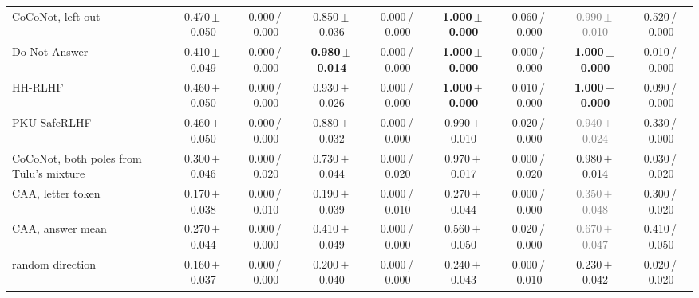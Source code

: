 \begin{tabular}{@{}lcccccccc@{}}
CoCoNot, left out & 0.470\,{\scriptsize$\pm$\,0.050} & {\scriptsize 0.000\,/\,0.000} & 0.850\,{\scriptsize$\pm$\,0.036} & {\scriptsize 0.000\,/\,0.000} & \textbf{1.000\,{\scriptsize$\pm$\,0.000}} & {\scriptsize 0.060\,/\,0.000} & \textcolor{gray}{0.990\,{\scriptsize$\pm$\,0.010}} & {\scriptsize 0.520\,/\,0.000} \\
Do-Not-Answer & 0.410\,{\scriptsize$\pm$\,0.049} & {\scriptsize 0.000\,/\,0.000} & \textbf{0.980\,{\scriptsize$\pm$\,0.014}} & {\scriptsize 0.000\,/\,0.000} & \textbf{1.000\,{\scriptsize$\pm$\,0.000}} & {\scriptsize 0.000\,/\,0.000} & \textbf{1.000\,{\scriptsize$\pm$\,0.000}} & {\scriptsize 0.010\,/\,0.000} \\
HH-RLHF & 0.460\,{\scriptsize$\pm$\,0.050} & {\scriptsize 0.000\,/\,0.000} & 0.930\,{\scriptsize$\pm$\,0.026} & {\scriptsize 0.000\,/\,0.000} & \textbf{1.000\,{\scriptsize$\pm$\,0.000}} & {\scriptsize 0.010\,/\,0.000} & \textbf{1.000\,{\scriptsize$\pm$\,0.000}} & {\scriptsize 0.090\,/\,0.000} \\
PKU-SafeRLHF & 0.460\,{\scriptsize$\pm$\,0.050} & {\scriptsize 0.000\,/\,0.000} & 0.880\,{\scriptsize$\pm$\,0.032} & {\scriptsize 0.000\,/\,0.000} & 0.990\,{\scriptsize$\pm$\,0.010} & {\scriptsize 0.020\,/\,0.000} & \textcolor{gray}{0.940\,{\scriptsize$\pm$\,0.024}} & {\scriptsize 0.330\,/\,0.000} \\
CoCoNot, both poles from T\"ulu's mixture & 0.300\,{\scriptsize$\pm$\,0.046} & {\scriptsize 0.000\,/\,0.020} & 0.730\,{\scriptsize$\pm$\,0.044} & {\scriptsize 0.000\,/\,0.020} & 0.970\,{\scriptsize$\pm$\,0.017} & {\scriptsize 0.000\,/\,0.020} & 0.980\,{\scriptsize$\pm$\,0.014} & {\scriptsize 0.030\,/\,0.020} \\
CAA, letter token & 0.170\,{\scriptsize$\pm$\,0.038} & {\scriptsize 0.000\,/\,0.010} & 0.190\,{\scriptsize$\pm$\,0.039} & {\scriptsize 0.000\,/\,0.010} & 0.270\,{\scriptsize$\pm$\,0.044} & {\scriptsize 0.000\,/\,0.000} & \textcolor{gray}{0.350\,{\scriptsize$\pm$\,0.048}} & {\scriptsize 0.300\,/\,0.020} \\
CAA, answer mean & 0.270\,{\scriptsize$\pm$\,0.044} & {\scriptsize 0.000\,/\,0.000} & 0.410\,{\scriptsize$\pm$\,0.049} & {\scriptsize 0.000\,/\,0.000} & 0.560\,{\scriptsize$\pm$\,0.050} & {\scriptsize 0.020\,/\,0.000} & \textcolor{gray}{0.670\,{\scriptsize$\pm$\,0.047}} & {\scriptsize 0.410\,/\,0.050} \\
random direction & 0.160\,{\scriptsize$\pm$\,0.037} & {\scriptsize 0.000\,/\,0.000} & 0.200\,{\scriptsize$\pm$\,0.040} & {\scriptsize 0.000\,/\,0.000} & 0.240\,{\scriptsize$\pm$\,0.043} & {\scriptsize 0.000\,/\,0.010} & 0.230\,{\scriptsize$\pm$\,0.042} & {\scriptsize 0.020\,/\,0.020} \\
\bottomrule
\end{tabular}
